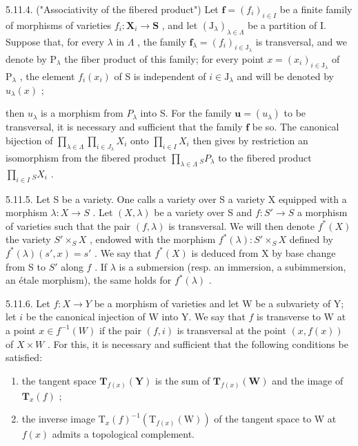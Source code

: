 5.11.4. ("Associativity of the fibered product") Let \(\mathbf{f} = (f_i)_{i \in I}\) be a finite family of morphisms of varieties \(f_i: \mathbf{X}_i \to \mathbf{S}\) , and let \((\mathrm{J}_{\lambda})_{\lambda \in \Lambda}\) be a partition of I. Suppose that, for every \(\lambda\) in \(\Lambda\) , the family \(\mathbf{f}_{\lambda} = (f_i)_{i \in \mathrm{J}_{\lambda}}\) is transversal, and we denote by \(\mathrm{P}_{\lambda}\) the fiber product of this family; for every point \(x = (x_i)_{i \in \mathrm{J}_{\lambda}}\) of \(\mathrm{P}_{\lambda}\) , the element \(f_i(x_i)\) of S is independent of \(i \in \mathrm{J}_{\lambda}\) and will be denoted by \(u_{\lambda}(x)\) ;

then \(u_{\lambda}\) is a morphism from \(P_{\lambda}\) into S. For the family \(\mathbf{u} = (u_{\lambda})\) to be transversal, it is necessary and sufficient that the family \(\mathbf{f}\) be so. The canonical bijection of \(\prod_{\lambda \in \Lambda} \prod_{i \in J_{\lambda}} X_i\) onto \(\prod_{i \in I} X_i\) then gives by restriction an isomorphism from the fibered product \(\prod_{\lambda \in \Lambda} {}_{S}P_{\lambda}\) to the fibered product \(\prod_{i \in I} {}_{S}X_i\) .

5.11.5. Let S be a variety. One calls a variety over S a variety X equipped with a morphism \(\lambda: X \to S\) . Let \((X, \lambda)\) be a variety over S and \(f: S' \to S\) a morphism of varieties such that the pair \((f, \lambda)\) is transversal. We will then denote \(f^*(X)\) the variety \(S' \times_{S} X\) , endowed with the morphism \(f^*(\lambda): S' \times_{S} X\) defined by \(f^*(\lambda)(s', x) = s'\) . We say that \(f^*(X)\) is deduced from X by base change from S to \(S'\) along \(f\) . If \(\lambda\) is a submersion (resp. an immersion, a subimmersion, an étale morphism), the same holds for \(f^*(\lambda)\) .

5.11.6. Let \(f: X \to Y\) be a morphism of varieties and let W be a subvariety of Y; let \(i\) be the canonical injection of W into Y. We say that \(f\) is transverse to W at a point \(x \in f^{-1}(W)\) if the pair \((f, i)\) is transversal at the point \((x, f(x))\) of \(X \times W\) . For this, it is necessary and sufficient that the following conditions be satisfied:

\begin{enumerate}
\def\labelenumi{(\roman{enumi})}
\item
  the tangent space \(\mathbf{T}_{f(x)}(\mathbf{Y})\) is the sum of \(\mathbf{T}_{f(x)}(\mathbf{W})\) and the image of \(\mathbf{T}_{x}(f)\) ;
\item
  the inverse image \(\mathrm{T}_{x}(f)^{-1}(\mathrm{T}_{f(x)}(\mathrm{W}))\) of the tangent space to W at \(f(x)\) admits a topological complement.
\end{enumerate}

